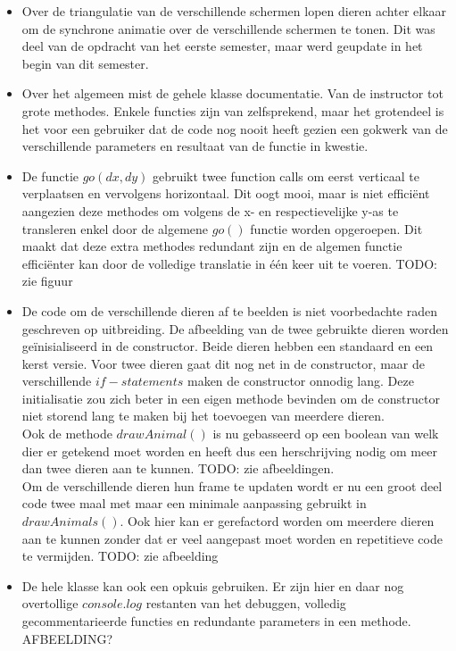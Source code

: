 \documentclass[a4paper,11pt]{article}
\begin{document}
\begin{itemize}
	\item Over de triangulatie van de verschillende schermen lopen dieren achter elkaar om de synchrone animatie over de verschillende schermen te tonen. Dit was deel van de opdracht van het eerste semester, maar werd geupdate in het begin van dit semester.
	
	\item Over het algemeen mist de gehele klasse documentatie. Van de instructor tot grote methodes. Enkele functies zijn van zelfsprekend, maar het grotendeel is het voor een gebruiker dat de code nog nooit heeft gezien een gokwerk van de verschillende parameters en resultaat van de functie in kwestie.
	
	\item De functie $go(dx, dy)$ gebruikt twee function calls om eerst verticaal te verplaatsen en vervolgens horizontaal. Dit oogt mooi, maar is niet efficiënt aangezien deze methodes om volgens de x- en respectievelijke y-as te transleren enkel door de algemene $go()$ functie worden opgeroepen. Dit maakt dat deze extra methodes redundant zijn en de algemen functie efficiënter kan door de volledige translatie in één keer uit te voeren. TODO: zie figuur
	
	\item De code om de verschillende dieren af te beelden is niet voorbedachte raden geschreven op uitbreiding. De afbeelding van de twee gebruikte dieren worden geïnisialiseerd in de constructor. Beide dieren hebben een standaard en een kerst versie. Voor twee dieren gaat dit nog net in de constructor, maar de verschillende $if-statements$ maken de constructor onnodig lang. Deze initialisatie zou zich beter in een eigen methode bevinden om de constructor niet storend lang te maken bij het toevoegen van meerdere dieren.\\
	Ook de methode $drawAnimal()$ is nu gebasseerd op een boolean van welk dier er getekend moet worden en heeft dus een herschrijving nodig om meer dan twee dieren aan te kunnen. TODO: zie afbeeldingen.\\
	Om de verschillende dieren hun frame te updaten wordt er nu een groot deel code twee maal met maar een minimale aanpassing gebruikt in $drawAnimals()$. Ook hier kan er gerefactord worden om meerdere dieren aan te kunnen zonder dat er veel aangepast moet worden en repetitieve code te vermijden. TODO: zie afbeelding
	
	\item De hele klasse kan ook een opkuis gebruiken. Er zijn hier en daar nog overtollige $console.log$ restanten van het debuggen, volledig gecommentarieerde functies en redundante parameters in een methode. AFBEELDING?
\end{itemize}
\end{document}
